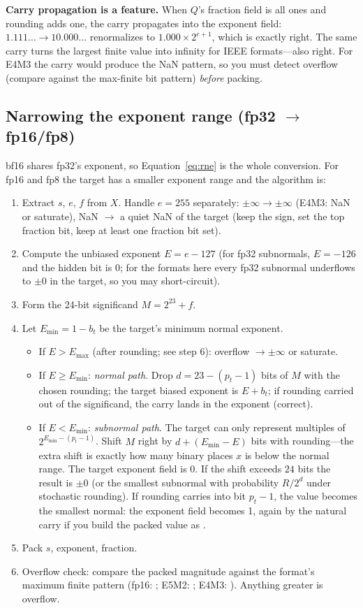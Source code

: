 \textbf{Carry propagation is a feature.} When $Q$'s fraction field is all ones and rounding adds one, the carry propagates into the exponent field: $1.111\ldots \to 10.000\ldots$ renormalizes to $1.000\times 2^{e+1}$, which is exactly right. The same carry turns the largest finite value into infinity for IEEE formats---also right. For E4M3 the carry would produce the NaN pattern, so you must detect overflow (compare against the max-finite bit pattern) \emph{before} packing.

\subsection{Narrowing the exponent range (fp32 $\to$ fp16/fp8)}

bf16 shares fp32's exponent, so Equation~\eqref{eq:rne} is the whole conversion. For fp16 and fp8 the target has a smaller exponent range and the algorithm is:

\begin{enumerate}
  \item Extract $s$, $e$, $f$ from $X$. Handle $e = 255$ separately: $\pm\infty\to\pm\infty$ (E4M3: NaN or saturate), NaN $\to$ a quiet NaN of the target (keep the sign, set the top fraction bit, keep at least one fraction bit set).
  \item Compute the unbiased exponent $E = e - 127$ (for fp32 subnormals, $E = -126$ and the hidden bit is 0; for the formats here every fp32 subnormal underflows to $\pm 0$ in the target, so you may short-circuit).
  \item Form the 24-bit significand $M = 2^{23} + f$.
  \item Let $E_{\min} = 1 - b_t$ be the target's minimum normal exponent.
    \begin{itemize}
      \item If $E > E_{\max}$ (after rounding; see step 6): overflow $\to \pm\infty$ or saturate.
      \item If $E \ge E_{\min}$: \emph{normal path}. Drop $d = 23 - (p_t-1)$ bits of $M$ with the chosen rounding; the target biased exponent is $E + b_t$; if rounding carried out of the significand, the carry lands in the exponent (correct).
      \item If $E < E_{\min}$: \emph{subnormal path}. The target can only represent multiples of $2^{E_{\min}-(p_t-1)}$. Shift $M$ right by $d + (E_{\min} - E)$ bits with rounding---the extra shift is exactly how many binary places $x$ is below the normal range. The target exponent field is 0. If the shift exceeds $24$ bits the result is $\pm 0$ (or the smallest subnormal with probability $R/2^d$ under stochastic rounding). If rounding carries into bit $p_t-1$, the value becomes the smallest normal: the exponent field becomes 1, again by the natural carry if you build the packed value as .
    \end{itemize}
  \item Pack $s$, exponent, fraction.
  \item Overflow check: compare the packed magnitude against the format's maximum finite pattern (fp16: ; E5M2: ; E4M3: ). Anything greater is overflow.
\end{enumerate}

